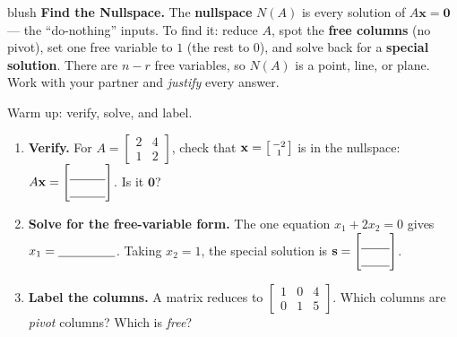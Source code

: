 \documentclass[10pt]{article}
\newcommand{\xx}{\mathbf{x}}
\newcommand{\svec}{\mathbf{s}}
\newcommand{\zero}{\mathbf{0}}
\begin{document}
\namepartnerperiod

\vspace{0.10in}

\begin{headlinebox}{blush}
\small\textbf{Find the Nullspace.} The \textbf{nullspace} $N(A)$ is every solution of $A\xx=\zero$ ---
the ``do-nothing'' inputs. To find it: reduce $A$, spot the \textbf{free columns} (no pivot), set one
free variable to $1$ (the rest to $0$), and solve back for a \textbf{special solution}. There are
$n-r$ free variables, so $N(A)$ is a point, line, or plane. Work with your partner and \emph{justify}
every answer.
\end{headlinebox}

\vspace{0.10in}

\begin{tcolorbox}[colback=white, colframe=black!40, title=\textbf{Tier R --- Remediate},
    fonttitle=\bfseries, arc=1.5mm, left=3mm, right=3mm, top=2mm, bottom=2mm, breakable]
Warm up: verify, solve, and label.
\begin{enumerate}[leftmargin=1.7em, itemsep=8pt]
  \item \textbf{Verify.} For $A=\begin{bmatrix} 2 & 4 \\ 1 & 2 \end{bmatrix}$, check that
        $\xx=\begin{bsmallmatrix} -2\\1 \end{bsmallmatrix}$ is in the nullspace:
        $A\xx=\begin{bmatrix}\rule{0pt}{1.0em}\blank{1.0cm}\\[2pt]\blank{1.0cm}\end{bmatrix}$. Is it $\zero$? \; \blank{1.6cm}
  \item \textbf{Solve for the free-variable form.} The one equation $x_1+2x_2=0$ gives
        $x_1=\blank{1.6cm}$. Taking $x_2=1$, the special solution is $\svec=\begin{bmatrix}\rule{0pt}{1.0em}\blank{0.8cm}\\[2pt]\blank{0.8cm}\end{bmatrix}$.
  \item \textbf{Label the columns.} A matrix reduces to $\begin{bmatrix} 1 & 0 & 4 \\ 0 & 1 & 5 \end{bmatrix}$.
        Which columns are \emph{pivot} columns? \blank{2.0cm} \; Which is \emph{free}? \blank{1.6cm}
\end{enumerate}
\end{tcolorbox}
\end{document}
